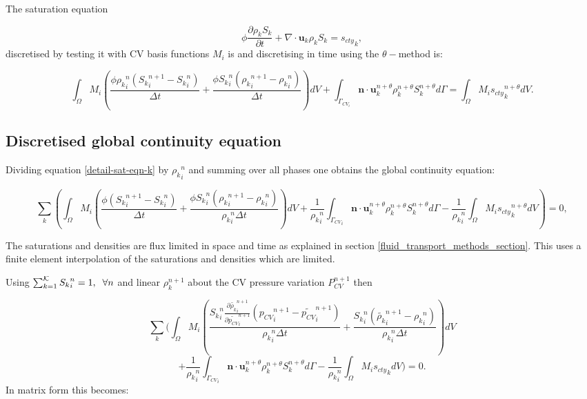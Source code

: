 The saturation equation

\begin{equation}
\phi\frac{\partial \rho_k S_k }{\partial t}
+ \nabla \cdot {\mathbf u}_k \rho_k S_k = {s_{cty}}_k,
\end{equation}
discretised by testing it with CV basis functions
 $M_i$ is and discretising in time using the
 $\theta-$method is:

\begin{equation}
\int_\Omega M_i (\frac{\phi{\rho_k}_i^n ({S_k}_i^{n+1}-{S_k}_i^n) }{\Delta t}
+ \frac{\phi{S_k}_i^n( {\rho_k}_i^{n+1}-{\rho_k}_i^n)} {\Delta t} ) dV
+ \int_{\Gamma_{CV_i}} {\mathbf n} \cdot {\mathbf u}_k^{n+\theta} \rho_k^{n+\theta} S_k^{n+\theta}
d\Gamma
= \int_\Omega M_i {s_{cty}}_k^{n+\theta} dV.
\label{detail-sat-eqn-k}
\end{equation}


\subsection{Discretised global continuity equation}

Dividing equation \ref{detail-sat-eqn-k} by ${\rho_k}^n_i $ and summing
over all phases one obtains the global continuity equation:


\begin{equation}
 \sum_k \left(
\int_\Omega M_i (\frac{ \phi({S_k}_i^{n+1}-{S_k}_i^n) }{\Delta t}
+ \frac{\phi{S_k}_i^n( {\rho_k}_i^{n+1}-{\rho_k}_i^n)} {{\rho_k}_i^n\Delta t} ) dV
+ \frac{1}{{\rho_k}_i^n}\int_{{\Gamma_{CV}}_i}
{\mathbf n} \cdot {\mathbf u}_k^{n+\theta} \rho_k^{n+\theta}   S_k^{n+\theta} d\Gamma
- \frac{1}{{\rho_k}_i^n} \int_\Omega M_i {s_{cty}}_k^{n+\theta} dV \right) =0,
\label{detail-sat-eqn-k-sum}
\end{equation}

The saturations and densities are flux limited in space and
time as explained in section \ref{fluid_transport_methods_section}. This uses a finite element
interpolation of the saturations and densities which are limited.



Using $\sum_{k=1}^{\cal K} {S_k}_i^n =1, \;\; \forall n$ and linear
$\rho_k^{n+1}$ about the CV pressure variation $P_{CV}^{n+1}$ then

\begin{equation}
 \sum_k ( \int_{\Omega} M_i
( \frac{{S_k}_i^n \frac{\partial \tilde{\rho_k}_i^{n+1}}{\partial \tilde{ p_{CV}}_i^{n+1}}({p_{CV}}_i^{n+1}-\tilde{p_{CV}}_i^{n+1})
} {{\rho_k}_i^n\Delta t}
+ \frac{{S_k}_i^n( \tilde{\rho_k}_i^{n+1}-{\rho_k}_i^n)}
{{\rho_k}_i^n \Delta t} ) dV
\end{equation}
\begin{equation}
+ \frac{1}{{\rho_k}_i^n}\int_{{\Gamma_{CV}}_i} {\mathbf n} \cdot {\mathbf u}_k^{n+\theta} \rho_k^{n+\theta} S_k^{n+\theta} d\Gamma
- \frac{1}{{\rho_k}_i^n} \int_\Omega M_i {s_{cty}}_k dV ) =0.
\label{detail-global-cty}
\end{equation}
In matrix form this becomes:

